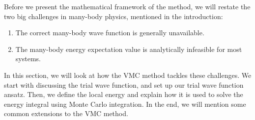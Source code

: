 Before we present the mathematical framework of the method, we will restate the two big challenges in many-body physics, mentioned in the introduction:
\begin{enumerate}
	\item The correct many-body wave function is generally unavailable.
	\item The many-body energy expectation value is analytically infeasible for most systems.
\end{enumerate}
In this section, we will look at how the VMC method tackles these challenges. We start with discussing the trial wave function, and set up our trial wave function ansatz. Then, we define the local energy and explain how it is used to solve the energy integral using Monte Carlo integration. In the end, we will mention some common extensions to the VMC method. 

